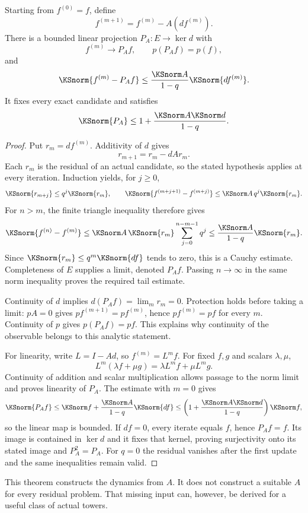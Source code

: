 \begin{KStheorem}\label{KS:KS19}
Starting from \(f^{(0)}=f\), define
\[
 f^{(m+1)}=f^{(m)}-A(df^{(m)}).
\]
There is a bounded linear projection \(P_A:E\to\ker d\) with
\[
 f^{(m)}\longrightarrow P_Af,\qquad p(P_Af)=p(f),
\]
and
\[
 \KSnorm{f^{(m)}-P_Af}
 \le\frac{\KSnorm A}{1-q}\KSnorm{df^{(m)}}.
\]
It fixes every exact candidate and satisfies
\[
 \KSnorm{P_A}\le1+\frac{\KSnorm A\KSnorm d}{1-q}.
\]
\end{KStheorem}
\begin{proof}
Put $r_m=df^{(m)}$. Additivity of $d$ gives
\[
 r_{m+1}=r_m-dAr_m.
\]
Each $r_m$ is the residual of an actual candidate, so the stated hypothesis applies at every iteration. Induction yields, for $j\ge0$,
\[
 \KSnorm{r_{m+j}}\le q^j\KSnorm{r_m},\qquad
 \KSnorm{f^{(m+j+1)}-f^{(m+j)}}
 \le\KSnorm A\,q^j\KSnorm{r_m}.
\]
For $n>m$, the finite triangle inequality therefore gives
\[
 \KSnorm{f^{(n)}-f^{(m)}}
 \le\KSnorm A\,\KSnorm{r_m}\sum_{j=0}^{n-m-1}q^j
 \le\frac{\KSnorm A}{1-q}\KSnorm{r_m}.
\]
Since $\KSnorm{r_m}\le q^m\KSnorm{df}$ tends to zero, this is a Cauchy estimate. Completeness of $E$ supplies a limit, denoted $P_Af$. Passing $n\to\infty$ in the same norm inequality proves the required tail estimate.

Continuity of $d$ implies $d(P_Af)=\lim_m r_m=0$. Protection holds before taking a limit: $pA=0$ gives $pf^{(m+1)}=pf^{(m)}$, hence $pf^{(m)}=pf$ for every $m$. Continuity of $p$ gives $p(P_Af)=pf$. This explains why continuity of the observable belongs to this analytic statement.

For linearity, write $L=I-Ad$, so $f^{(m)}=L^mf$. For fixed $f,g$ and scalars $\lambda,\mu$,
\[
 L^m(\lambda f+\mu g)=\lambda L^mf+\mu L^mg.
\]
Continuity of addition and scalar multiplication allows passage to the norm limit and proves linearity of $P_A$. The estimate with $m=0$ gives
\[
 \KSnorm{P_Af}\le\KSnorm f+\frac{\KSnorm A}{1-q}\KSnorm{df}
 \le\left(1+\frac{\KSnorm A\KSnorm d}{1-q}\right)\KSnorm f,
\]
so the linear map is bounded. If $df=0$, every iterate equals $f$, hence $P_Af=f$. Its image is contained in $\ker d$ and it fixes that kernel, proving surjectivity onto its stated image and $P_A^2=P_A$. For $q=0$ the residual vanishes after the first update and the same inequalities remain valid.
\end{proof}
This theorem constructs the dynamics from \(A\). It does not construct a suitable \(A\) for every residual problem. That missing input can, however, be derived for a useful class of actual towers.

